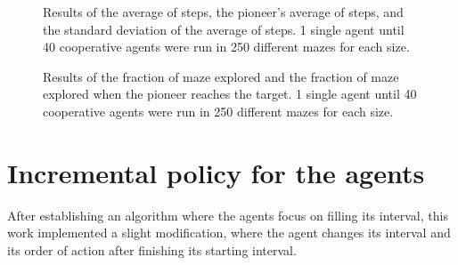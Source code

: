 \begin{figure}
    \centering
    \qquad
    \qquad
    \newline
    \qquad
    \caption{Results of the average of steps, the pioneer's average of steps, and the standard deviation of the average of steps. 1 single agent until 40 cooperative agents were run in 250 different mazes for each size.}
    \label{our_algorithm_steps}
\end{figure}

\begin{figure}
    \centering
    \qquad
    \qquad
    \newline
    \qquad
    \caption{Results of the fraction of maze explored and the fraction of maze explored when the pioneer reaches the target. 1 single agent until 40 cooperative agents were run in 250 different mazes for each size.}
    \label{our_algorithm_fraction}
\end{figure}


\section{Incremental policy for the agents}
\label{section_results_incremental_policy}

After establishing an algorithm where the agents focus on filling its interval, this work implemented a slight modification, where the agent changes its interval and its order of action after finishing its starting interval.

